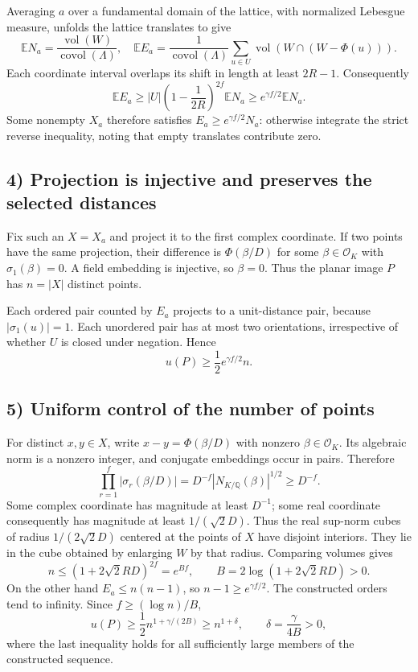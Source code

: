 Averaging $a$ over a fundamental domain of the lattice, with
normalized Lebesgue measure, unfolds the lattice translates to give
\[
 \mathbb EN_a=\frac{\operatorname{vol}(W)}{\operatorname{covol}(\Lambda)},
 \quad
 \mathbb EE_a=\frac1{\operatorname{covol}(\Lambda)}
       \sum_{u\in U}\operatorname{vol}(W\cap(W-\Phi(u))).
\]
Each coordinate interval overlaps its shift in length at least
$2R-1$. Consequently
\[
 \mathbb EE_a\geq
 |U|\left(1-\frac1{2R}\right)^{2f}\mathbb EN_a
 \geq e^{\gamma f/2}\mathbb EN_a.
\]
Some nonempty $X_a$ therefore satisfies
$E_a\geq e^{\gamma f/2}N_a$: otherwise integrate the strict reverse
inequality, noting that empty translates contribute zero.

\subsection{4) Projection is injective and preserves the selected distances}
Fix such an $X=X_a$ and project it to the first complex coordinate.
If two points have the same projection, their difference is
$\Phi(\beta/D)$ for some $\beta\in\mathcal O_K$ with
$\sigma_1(\beta)=0$. A field embedding is injective, so $\beta=0$.
Thus the planar image $P$ has $n=|X|$ distinct points.

Each ordered pair counted by $E_a$ projects to a unit-distance pair,
because $|\sigma_1(u)|=1$. Each unordered pair has at most two
orientations, irrespective of whether $U$ is closed under negation.
Hence
\[
 u(P)\geq\frac12 e^{\gamma f/2}n.
\]

\subsection{5) Uniform control of the number of points}
For distinct $x,y\in X$, write $x-y=\Phi(\beta/D)$ with nonzero
$\beta\in\mathcal O_K$. Its algebraic norm is a nonzero integer,
and conjugate embeddings occur in pairs. Therefore
\[
 \prod_{r=1}^f|\sigma_r(\beta/D)|
 =D^{-f}|N_{K/\mathbb Q}(\beta)|^{1/2}\geq D^{-f}.
\]
Some complex coordinate has magnitude at least $D^{-1}$; some real
coordinate consequently has magnitude at least $1/(\sqrt2D)$.
Thus the real sup-norm cubes of radius $1/(2\sqrt2D)$ centered
at the points of $X$ have disjoint interiors. They lie in the
cube obtained by enlarging $W$ by that radius. Comparing volumes gives
\[
 n\leq(1+2\sqrt2RD)^{2f}=e^{Bf},\qquad
 B=2\log(1+2\sqrt2RD)>0.
\]
On the other hand $E_a\leq n(n-1)$, so
$n-1\geq e^{\gamma f/2}$. The constructed orders tend to infinity.
Since $f\geq(\log n)/B$,
\[
 u(P)\geq\frac12 n^{1+\gamma/(2B)}
          \geq n^{1+\delta},\qquad \delta=\frac\gamma{4B}>0,
\]
where the last inequality holds for all sufficiently large members
of the constructed sequence.

